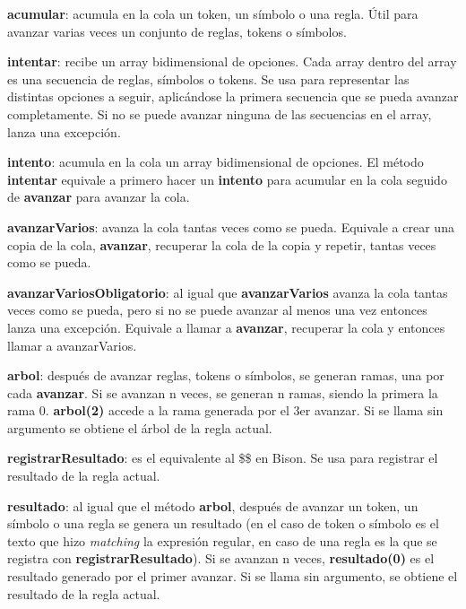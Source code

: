 \documentclass{report}
\begin{document}
	\vspace{10px}
	\noindent
	\textbf{acumular}: acumula en la cola un token, un símbolo o una regla. Útil para avanzar varias veces un conjunto de reglas, tokens o símbolos.
	
	\vspace{10px}
	\noindent
	\textbf{intentar}: recibe un array bidimensional de opciones. Cada array dentro del array es una secuencia de reglas, símbolos o tokens. Se usa para representar las distintas opciones a seguir, aplicándose la primera secuencia que se pueda avanzar completamente. Si no se puede avanzar ninguna de las secuencias en el array, lanza una excepción. 
	
	\vspace{10px}
	\noindent
	\textbf{intento}: acumula en la cola un array bidimensional de opciones. El método \textbf{intentar} equivale a primero hacer un \textbf{intento} para acumular en la cola seguido de \textbf{avanzar} para avanzar la cola.
	
	\vspace{10px}
	\noindent
	\textbf{avanzarVarios}: avanza la cola tantas veces como se pueda. Equivale a crear una copia de la cola, \textbf{avanzar}, recuperar la cola de la copia y repetir, tantas veces como se pueda. 
	
	\vspace{10px}
	\noindent
	\textbf{avanzarVariosObligatorio}: al igual que \textbf{avanzarVarios} avanza la cola tantas veces como se pueda, pero si no se puede avanzar al menos una vez entonces lanza una excepción. Equivale a llamar a \textbf{avanzar}, recuperar la cola y entonces llamar a avanzarVarios.
	
	\vspace{10px}
	\textbf{arbol}: después de avanzar reglas, tokens o símbolos, se generan ramas, una por cada \textbf{avanzar}. Si se avanzan n veces, se generan n ramas, siendo la primera la rama 0. \textbf{arbol(2)} accede a la rama generada por el 3er avanzar. Si se llama sin argumento se obtiene el árbol de la regla actual.
	
	\vspace{10px}
	\textbf{registrarResultado}: es el equivalente al \$\$ en Bison. Se usa para registrar el resultado de la regla actual.
	
	\vspace{10px}
	\textbf{resultado}: al igual que el método \textbf{arbol}, después de avanzar un token, un símbolo o una regla se genera un resultado (en el caso de token o símbolo es el texto que hizo \textit{matching} la expresión regular, en caso de una regla es la que se registra con \textbf{registrarResultado}). Si se avanzan n veces, \textbf{resultado(0)} es el resultado generado por el primer avanzar. Si se llama sin argumento, se obtiene el resultado de la regla actual.
\end{document}
